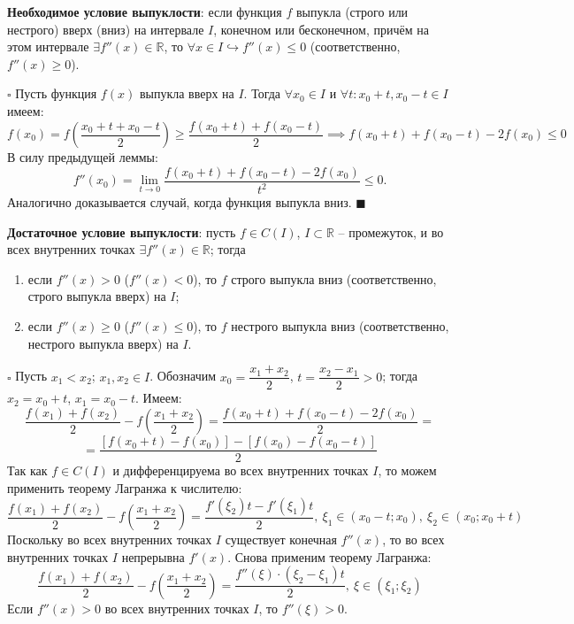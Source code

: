 \documentclass[12pt, a4paper, reqno]{article}
\begin{document}
    \textbf{Необходимое условие выпуклости}: если функция $f$ выпукла (строго или нестрого) вверх
    (вниз) на интервале $I$, конечном или бесконечном, причём на этом интервале
    $\exists f''(x)\in\mathbb{R}$, то $\forall x\in I\hookrightarrow f''(x) \leq 0$ (соответственно,
    $f''(x) \geq 0$).

    $\square$ Пусть функция $f(x)$ выпукла вверх на $I$. Тогда $\forall x_0 \in I$ и $\forall t:
    x_0 + t, x_0 - t \in I$ имеем:
    \begin{equation*}
        f(x_0) = f\left(\dfrac{x_0 + t + x_0 - t}{2}\right) \geq \dfrac{f(x_0 + t) + f(x_0 - t)}{2}
        \implies f(x_0 + t) + f(x_0 - t) - 2f(x_0) \leq 0
    \end{equation*}
    В силу предыдущей леммы:
    \begin{equation*}
        f''(x_0) = \lim\limits_{t\to 0} \dfrac{f(x_0 + t) + f(x_0 - t) - 2f(x_0)}{t^2} \leq 0.
    \end{equation*}
    Аналогично доказывается случай, когда функция выпукла вниз. $\blacksquare$

    \textbf{Достаточное условие выпуклости}: пусть $f \in C(I)$, $I \subset \mathbb{R}$ -- промежуток,
    и во всех внутренних точках $\exists f''(x)\in\mathbb{R}$; тогда
    \begin{enumerate}
        \item если $f''(x) > 0$ ($f''(x) < 0$), то $f$ строго выпукла вниз (соответственно, строго
              выпукла вверх) на $I$;
        \item если $f''(x) \geq 0$ ($f''(x) \leq 0$), то $f$ нестрого выпукла вниз (соответственно,
              нестрого выпукла вверх) на $I$.
    \end{enumerate}

    $\square$ Пусть $x_1 < x_2$; $x_1, x_2\in I$. Обозначим $x_0 = \dfrac{x_1 + x_2}{2}$,
    $t = \dfrac{x_2 - x_1}{2} > 0$; тогда $x_2 = x_0 + t$, $x_1 = x_0 - t$. Имеем:
    \begin{equation*}
        \dfrac{f(x_1) + f(x_2)}{2} - f\left(\dfrac{x_1 + x_2}{2}\right) =
        \dfrac{f(x_0 + t) + f(x_0 - t) - 2f(x_0)}{2} =
    \end{equation*}
    \begin{equation*}
        = \dfrac{[f(x_0 + t) - f(x_0)] - [f(x_0) - f(x_0 - t)]}{2}
    \end{equation*}
    Так как $f \in C(I)$ и дифференцируема во всех внутренних точках $I$, то можем применить
    теорему Лагранжа к числителю:
    \begin{equation*}
        \dfrac{f(x_1) + f(x_2)}{2} - f\left(\dfrac{x_1 + x_2}{2}\right) =
        \dfrac{f'(\xi_2)t - f'(\xi_1)t}{2},\ \xi_1\in(x_0 - t; x_0),\ \xi_2\in(x_0; x_0 + t)
    \end{equation*}
    Поскольку во всех внутренних точках $I$ существует конечная $f''(x)$, то во всех внутренних
    точках $I$ непрерывна $f'(x)$. Снова применим теорему Лагранжа:
    \begin{equation*}
        \dfrac{f(x_1) + f(x_2)}{2} - f\left(\dfrac{x_1 + x_2}{2}\right) =
        \dfrac{f''(\xi) \cdot (\xi_2 - \xi_1)t}{2},\ \xi\in(\xi_1; \xi_2)
    \end{equation*}
    Если $f''(x) > 0$ во всех внутренних точках $I$, то $f''(\xi) > 0$.
\end{document}
